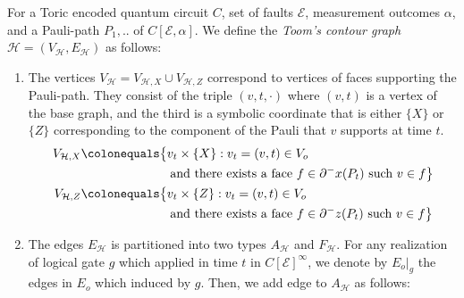 \begin{definition}
    \label{def:contour}
    For a Toric encoded quantum circuit $C$, set of faults $\mathcal{E}$, measurement outcomes $\alpha$, and a Pauli-path $P_{1},..$ of $C[\mathcal{E}, \alpha]$. We define the \textit{Toom's contour graph} $\mathcal{H} = (V_{\mathcal{H}}, E_{\mathcal{H}})$ as follows: 
    \begin{enumerate}
      \item The vertices $V_{\mathcal{H}} = V_{\mathcal{H}, X} \cup V_{\mathcal{H}, Z}$ correspond to vertices of faces supporting the Pauli-path. They consist of the triple $(v,t,\cdot)$ where $(v,t)$ is a vertex of the base graph, and the third is a symbolic coordinate that is either $\{X\}$ or $\{Z\}$ corresponding to the component of the Pauli that $v$ supports at time $t$.
        \begin{equation*}
          \begin{split}
            V_{\mathcal{H}, X} \colonequals & \big\{ v_{t} \times \{X\} : v_{t}=(v,t) \in V_{o} \\
            & \, \, \, \text{ and there exists a face } f \in \partial^{-} x(P_{t}) \text{ such } v \in f \big\} \\
             V_{\mathcal{H}, Z} \colonequals & \big\{ v_{t} \times \{Z\} : v_{t}=(v,t) \in V_{o} \\
             & \, \, \, \text{ and there exists a face } f \in \partial^{-} z(P_{t}) \text{ such } v \in f \big\} 
          \end{split}
        \end{equation*}


      \item The edges $E_{\mathcal{H}}$ is partitioned into two types $A_{\mathcal{H}}$ and $F_{\mathcal{H}}$. For any realization of logical gate $g$ which applied in time $t$ in $C[\mathcal{E}]^{\infty} $, we denote by $E_{o}|_{g}$ the edges in $E_{o}$ which induced by $g$. Then, we add edge to $A_{\mathcal{H}}$ as follows: 


\end{enumerate}
\end{definition}
